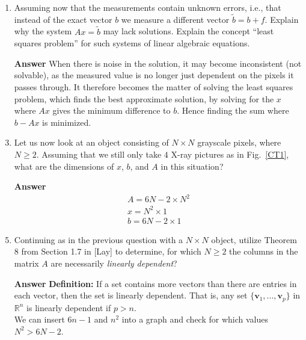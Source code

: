 \documentclass[10pt,a4paper]{article}
\theoremstyle{plain}
\theoremstyle{definition}
\begin{document}
\begin{enumerate}
  \item Assuming now that the measurements contain unknown errors, i.e., that instead of the exact vector \(b\) we measure a different vector
  \(\tilde{b} = b + f\).
  Explain why the system \(Ax=\tilde{b}\) may lack solutions.
  Explain the concept ``least squares problem'' for such systems of linear algebraic equations.
  \item[\textbf{Answer}] When there is noise in the solution, it may become inconsistent (not solvable), as the measured value is no longer just dependent on the pixels it passes through. It therefore becomes the matter of solving the least squares problem, which finds the best approximate solution, by solving for the $x$ where $Ax$ gives the minimum difference to $b$. Hence finding the sum where $b-Ax$ is minimized.

  \item Let us now look at an object consisting of \(N\times N\) grayscale pixels, where \(N\geq 2\).
  Assuming that we still only take \(4\) X-ray pictures as in Fig.~\ref{CT1},
  what are the dimensions of \(x\), \(b\), and \(A\) in this situation?
  \item[\textbf{Answer}] 
  \begin{align*}
    A=6N-2\times N^2 \\
    x=N^2 \times 1 \\
    b=6N-2 \times 1
  \end{align*}

  \item Continuing as in the previous question with a \(N\times N\) object,
  utilize Theorem 8 from Section 1.7 in [Lay] to determine, for which
  \(N \geq 2\) the columns in the matrix \(A\) are necessarily \emph{linearly dependent}?
  \item[\textbf{Answer}]
  \textbf{Definition:} If a set contains more vectors than there are entries in each vector, then the set is linearly dependent. That is, any set $\{\mathbf{v}_1, . . . , \mathbf{v}_p\}$ in $\mathbb{R}^n$ is linearly dependent if $p > n$. \\
  We can insert $6n-1$ and $n^2$ into a graph and check for which values $N^2>6N-2$.

  \def\FunctionF(#1){(#1)^2}
  \def\FunctionG(#1){6*(#1)-2}


\end{enumerate}
\end{document}
